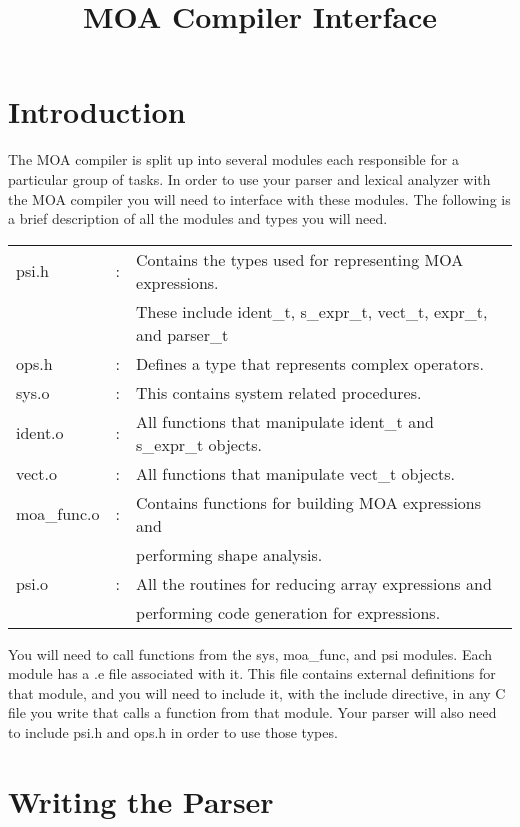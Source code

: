 
\title{MOA Compiler Interface}
\author{}


\maketitle

\section{Introduction}

  The MOA compiler is split up into several modules each responsible for
a particular group of tasks.  In order to use your parser and lexical analyzer
with the MOA compiler you will need to interface with these modules.  The 
following is a brief description of all the modules and types you will need.  

\begin{tabular}{lcl}
psi.h &	: & Contains the types used for representing MOA expressions. \\
 & & These include ident\_t, s\_expr\_t, vect\_t, expr\_t, and parser\_t \\
ops.h &	: & Defines a type that represents complex operators. \\
sys.o &	: & This contains system related procedures. \\
ident.o	& : & All functions that manipulate ident\_t and s\_expr\_t objects. \\
vect.o & : & All functions that manipulate vect\_t objects. \\
moa\_func.o & : & Contains functions for building MOA expressions and  \\
 & & performing shape analysis. \\
psi.o &	: & All the routines for reducing array expressions and \\
 & & performing code generation for expressions.
\end{tabular}

  You will need to call functions from the sys, moa\_func, and psi modules.
Each module has a .e file associated with it.  This file contains external
definitions for that module, and you will need to include it, with the
include directive, in any C file you write that calls a function from that
module.  Your parser will also need to include psi.h and ops.h in order to
use those types.

\section{Writing the Parser}
 
